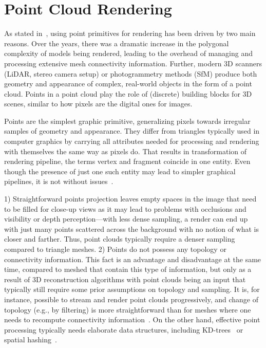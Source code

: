 \chapter{Point Cloud Rendering} \label{chap:pcd_rendering}

As stated in~\citet{PointRendering}, using point primitives for rendering has been driven
by two main reasons. Over the years,
there was a dramatic increase in the polygonal complexity of models being rendered, leading to
the overhead of managing and processing extensive mesh connectivity information.
Further, modern 3D scanners (LiDAR, stereo camera setup) or photogrammetry methods (SfM) produce
both geometry and appearance of complex, real-world objects in the form of a point cloud. Points in a point cloud
play the role of (discrete) building blocks for 3D scenes, similar to how pixels are the digital ones for images.

Points are the simplest graphic primitive, generalizing pixels towards irregular samples of
geometry and appearance. They differ from triangles typically used in computer graphics
by carrying all attributes needed for processing and rendering with themselves the same way
as pixels do. That results in transformation of rendering pipeline, the terms vertex and fragment coincide in
one entity. Even though the presence of just one such entity may lead to simpler graphical pipelines,
it is not without issues~\citep{ComputeShaderRendering}.

1) Straightforward points projection leaves empty spaces in the image that need to be filled
for close-up views as it may lead to problems with occlusions and visibility or depth perception---with
less dense sampling, a render can end up with just many points scattered across
the background with no notion of what is closer and farther. Thus, point clouds typically
require a denser sampling compared to triangle meshes. 2) Points do not possess any topology or
connectivity information. This fact is an advantage and disadvantage at the same time, compared to
meshed that contain this type of information, but only as a result of 3D reconstruction
algorithms with point clouds being an input that typically still require some prior assumptions on topology
and sampling. It is, for instance, possible to stream and render point clouds progressively, and
change of topology (e.g., by filtering) is more straightforward than for meshes where one needs to recompute
connectivity information~\citep{PointRendering}. On the other hand, effective point processing typically needs
elaborate data structures, including KD-trees~\citep{KDTree} or spatial hashing~\citep{SpatialHashing}.

